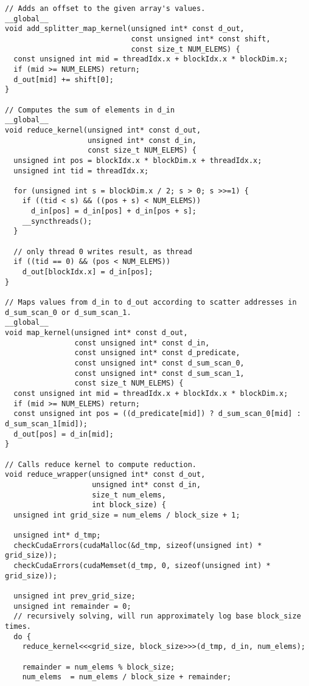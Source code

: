 \begin{lstlisting}[captionpos=t, xleftmargin=0.0pt, xrightmargin=0.0pt, caption={Radix Sort implementation}, label={lst:radix sort full}]
// Adds an offset to the given array's values.
__global__
void add_splitter_map_kernel(unsigned int* const d_out,
                             const unsigned int* const shift, 
                             const size_t NUM_ELEMS) {
  const unsigned int mid = threadIdx.x + blockIdx.x * blockDim.x;
  if (mid >= NUM_ELEMS) return;
  d_out[mid] += shift[0];
}

// Computes the sum of elements in d_in
__global__ 
void reduce_kernel(unsigned int* const d_out,
                   unsigned int* const d_in,
                   const size_t NUM_ELEMS) {
  unsigned int pos = blockIdx.x * blockDim.x + threadIdx.x;
  unsigned int tid = threadIdx.x;

  for (unsigned int s = blockDim.x / 2; s > 0; s >>=1) {
    if ((tid < s) && ((pos + s) < NUM_ELEMS))
      d_in[pos] = d_in[pos] + d_in[pos + s];
    __syncthreads();
  }

  // only thread 0 writes result, as thread
  if ((tid == 0) && (pos < NUM_ELEMS))
    d_out[blockIdx.x] = d_in[pos];
}

// Maps values from d_in to d_out according to scatter addresses in d_sum_scan_0 or d_sum_scan_1.
__global__
void map_kernel(unsigned int* const d_out,
                const unsigned int* const d_in,
                const unsigned int* const d_predicate,
                const unsigned int* const d_sum_scan_0,
                const unsigned int* const d_sum_scan_1,
                const size_t NUM_ELEMS) {
  const unsigned int mid = threadIdx.x + blockIdx.x * blockDim.x;
  if (mid >= NUM_ELEMS) return;
  const unsigned int pos = ((d_predicate[mid]) ? d_sum_scan_0[mid] : d_sum_scan_1[mid]);
  d_out[pos] = d_in[mid];
}

// Calls reduce kernel to compute reduction.
void reduce_wrapper(unsigned int* const d_out,
                    unsigned int* const d_in,
                    size_t num_elems,
                    int block_size) {
  unsigned int grid_size = num_elems / block_size + 1;

  unsigned int* d_tmp;
  checkCudaErrors(cudaMalloc(&d_tmp, sizeof(unsigned int) * grid_size));
  checkCudaErrors(cudaMemset(d_tmp, 0, sizeof(unsigned int) * grid_size));

  unsigned int prev_grid_size;
  unsigned int remainder = 0;
  // recursively solving, will run approximately log base block_size times.
  do {
    reduce_kernel<<<grid_size, block_size>>>(d_tmp, d_in, num_elems);

    remainder = num_elems % block_size;
    num_elems  = num_elems / block_size + remainder;


\end{lstlisting}
